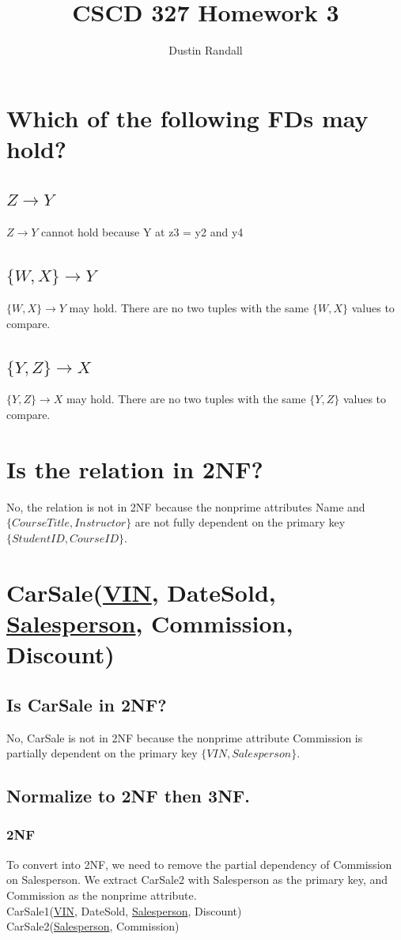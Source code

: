 \documentclass{article}
\begin{document}
\title{CSCD 327 Homework 3}
\author{Dustin Randall}
\maketitle

\section{Which of the following FDs may hold?}
\subsection{$Z \rightarrow Y$}
$Z \rightarrow Y$ cannot hold because Y at z3 = y2 and y4
\subsection{$\{W, X \} \rightarrow Y$}
$\{W, X \} \rightarrow Y$ may hold. There are no two tuples with the same $\{W, X\}$ values to compare.
\subsection{$\{Y, Z \} \rightarrow X$}
$\{Y, Z \} \rightarrow X$ may hold. There are no two tuples with the same $\{Y, Z\}$ values to compare.

\section{Is the relation in 2NF?}
No, the relation is not in 2NF because the nonprime attributes Name and $\{Course Title, Instructor\}$
are not fully dependent on the primary key $\{StudentID, CourseID\}$.

\section{CarSale(\underline{VIN}, DateSold, \underline{Salesperson}, Commission, Discount)}
\subsection{Is CarSale in 2NF?}
No, CarSale is not in 2NF because the nonprime attribute Commission is partially dependent on the primary key $\{VIN, Salesperson\}$.
\subsection{Normalize to 2NF then 3NF.}
\subsubsection{2NF}
To convert into 2NF, we need to remove the partial dependency of Commission on Salesperson.
We extract CarSale2 with Salesperson as the primary key, and Commission as the nonprime attribute. \\
CarSale1(\underline{VIN}, DateSold, \underline{Salesperson}, Discount) \\
CarSale2(\underline{Salesperson}, Commission) \\
\end{document}
